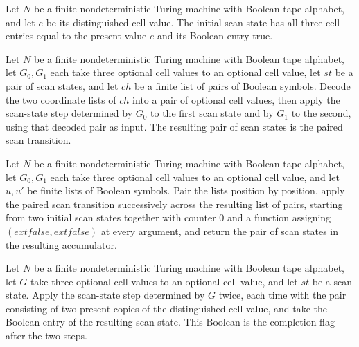 \begin{definition}
\label{Complexity.Codec.sInit}
\leanok
{}
Let $N$ be a finite nondeterministic Turing machine with Boolean tape alphabet, and let
$e$ be its distinguished cell value. The initial scan state has all three cell entries
equal to the present value $e$ and its Boolean entry true.
\end{definition}

\begin{definition}
\label{Complexity.Codec.sChunk}
\leanok
{}
Let $N$ be a finite nondeterministic Turing machine with Boolean tape alphabet, let
$G_0,G_1$ each take three optional cell values to an optional cell value, let $st$ be a
pair of scan states, and let $ch$ be a finite list of pairs of Boolean symbols. Decode
the two coordinate lists of $ch$ into a pair of optional cell values, then apply the
scan-state step determined by $G_0$ to the first scan state and by $G_1$ to the second,
using that decoded pair as input. The resulting pair of scan states is the paired scan
transition.
\end{definition}

\begin{definition}
\label{Complexity.Codec.sScan}
\leanok
{}
Let $N$ be a finite nondeterministic Turing machine with Boolean tape alphabet, let
$G_0,G_1$ each take three optional cell values to an optional cell value, and let $u,u'$
be finite lists of Boolean symbols. Pair the lists position by position, apply the
paired scan transition successively across the resulting list of pairs, starting from
two initial scan states together with counter $0$ and a function assigning
$(	ext{false},	ext{false})$ at every argument, and return the pair of scan states in the
resulting accumulator.
\end{definition}

\begin{definition}
\label{Complexity.Codec.sDone}
\leanok
{}
Let $N$ be a finite nondeterministic Turing machine with Boolean tape alphabet, let $G$
take three optional cell values to an optional cell value, and let $st$ be a scan state.
Apply the scan-state step determined by $G$ twice, each time with the pair consisting of
two present copies of the distinguished cell value, and take the Boolean entry of the
resulting scan state. This Boolean is the completion flag after the two steps.
\end{definition}


